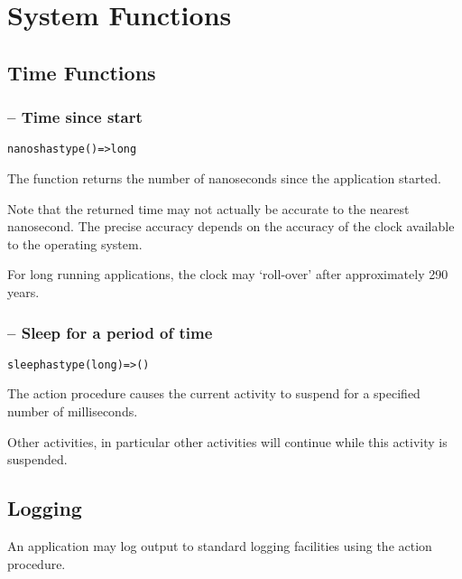 \chapter{System Functions}
\label{systemFunctions}

\section{Time Functions}
\label{timeFunctions}

\subsection{ -- Time since start}
\begin{alltt}
nanos has type ()=>long
\end{alltt}

The  function returns the number of nanoseconds since the application started.
\begin{aside}
Note that the returned time may not actually be accurate to the nearest nanosecond. The precise accuracy depends on the accuracy of the clock available to the operating system.
\end{aside}
\begin{aside}
For long running applications, the  clock may `roll-over' after approximately 290 years.
\end{aside}


\subsection{ -- Sleep for a period of time}

\begin{alltt}
sleep has type (long)=>()
\end{alltt}
The  action procedure causes the current activity to suspend for a specified number of milliseconds. 
\begin{aside}
Other activities, in particular other  activities will continue while this activity is suspended.
\end{aside}

\section{Logging}
An application may log output to standard logging facilities using the  action procedure.

